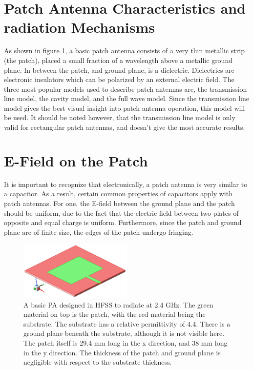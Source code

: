 \documentclass[12pt]{article}
\begin{document}
\section{Patch Antenna Characteristics and radiation Mechanisms}

As shown in figure 1, a basic patch antenna consists of a very thin metallic strip (the patch), placed a small fraction of a wavelength above a metallic ground plane. In between the patch, and ground plane, is a dielectric. Dielectrics are electronic insulators which can be polarized by an external electric field. The three most popular models used to describe patch antennas are, the transmission line model, the cavity model, and the full wave model\cite{balanis2016antenna}. Since the transmission line model gives the best visual insight\cite{balanis2016antenna} into patch antenna operation, this model will be used. It should be noted however, that the transmission line model is only valid for rectangular patch antennas, and doesn't give the most accurate results\cite{balanis2016antenna}.  

\section{E-Field on the Patch}
It is important to recognize that electronically, a patch antenna is very similar to a capacitor. As a result, certain common properties of capacitors apply with patch antennas. For one, the E-field between the ground plane and the patch should be uniform, due to the fact that the electric field between two plates of opposite and equal charge is uniform. Furthermore, since the patch and ground plane are of finite size, the edges of the patch undergo fringing.
\begin{figure}[h]
    \centering
    \includegraphics[width=0.5\textwidth]{2.4GHz-basic-pa.png}
    \caption{A basic PA designed in HFSS to radiate at 2.4 GHz. The green material on top is the patch, with the red material being the substrate. The substrate has a relative permittivity of 4.4. There is a ground plane beneath the substrate, although it is not visible here. The patch itself is 29.4 mm long in the x direction, and 38 mm long in the y direction. The thickness of the patch and ground plane is negligible with respect to the substrate thickness. }
\end{figure}
\end{document}
